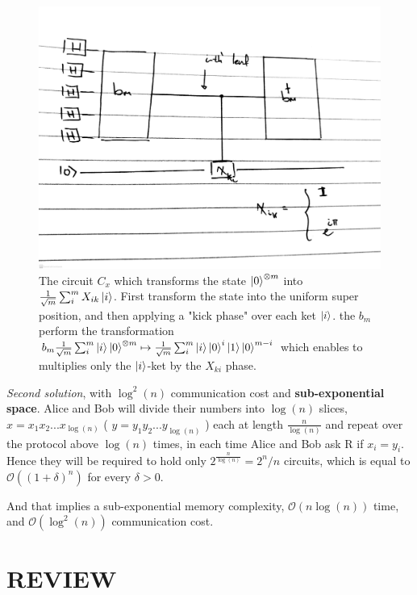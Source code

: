 \documentclass{article}
\newcommand{\onotation}[1]{\(\mathcal{O} \left( {#1}  \right) \)}
\newcommand{\ona}[1]{\onotation{#1}}
\begin{document}
\begin{enumerate}
\begin{figure}[H]
\includegraphics[scale=0.13]{binarysearch_2}
\caption{The circuit \( C_x \) which transforms the state \(\ket{0}^{\otimes m}\) into \(\frac{1}{\sqrt{m}}\sum_{i}^{m}{X_{ik}\ket{i}}\). First transform the state into the uniform super position, and then applying a "kick phase" over each ket \( \ket{i} \). the \(b_m\) perform the transformation \(b_m \frac{1}{\sqrt{m}}\sum_{i}^{m}{\ket{i} \ket{0}^{\otimes m} } \mapsto \frac{1}{\sqrt{m}}\sum_{i}^{m}{\ket{i} \ket{0}^{i }}\ket{1}\ket{0}^{m - i }  \)  which enables to multiplies only the \(\ket{i}\)-ket by the \(X_{ki}\) phase. }
    \label{fig:simulation_cases}
\end{figure}

\textit{Second solution}, with \( \log^2(n) \) communication cost and \textbf{sub-exponential space}. Alice and Bob will divide their numbers into \(\log(n)\) slices, \(x=x_1x_2...x_{\log(n)}\) ( \(y=y_1y_2...y_{\log(n)}\) ) each at length \( \frac{n}{\log(n)} \) and repeat over the protocol above \(\log(n)\) times, in each time Alice and Bob ask R if \(x_i = y_i\). Hence they will be required to hold only \( 2^{\frac{n}{\log(n)}} = 2^n/n \) circuits, which is equal to \ona{(1+\delta)^n} for every \(\delta > 0\).

And that implies a sub-exponential memory complexity, \ona{ n\log(n)} time, and \ona{\log^2(n)} communication cost.   

\end{enumerate}


\part{REVIEW} 
\end{document}
